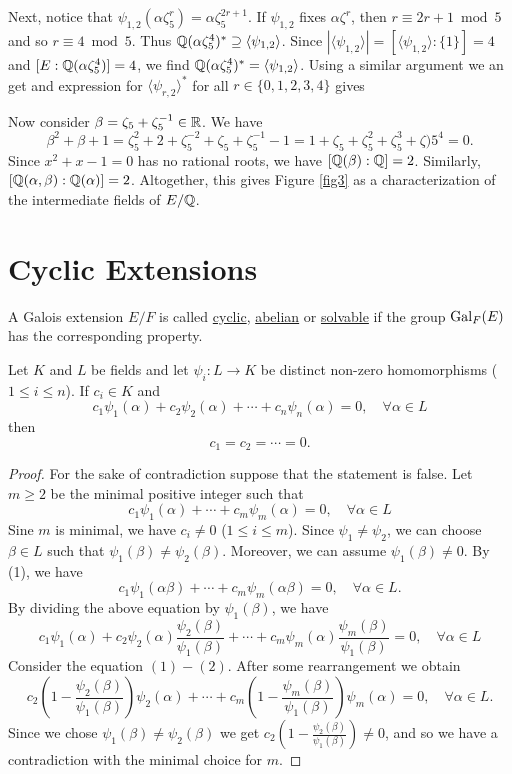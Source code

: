 \documentclass[11pt]{article}
\begin{document}
Next, notice that $\psi_{1,2}(\alpha\zeta_5^r)=\alpha\zeta_5^{2r+1}$. If $\psi_{1,2}$ fixes $\alpha\zeta^r$, then $r\equiv2r+1\bmod{5}$ and so $r\equiv4\bmod{5}$. Thus $\mathbb{Q}(\alpha\zeta_5^4)^*\supseteq\langle\psi_{1,2}\rangle$. Since $|\langle\psi_{1,2}\rangle|=[\langle\psi_{1,2}\rangle:\{1\}]=4$ and $[E:\mathbb{Q}(\alpha\zeta_5^4)]=4$, we find $\mathbb{Q}(\alpha\zeta_5^4)^*=\langle\psi_{1,2}\rangle$. Using a similar argument we an get  and expression for $\langle\psi_{r,2}\rangle^*$ for all $r\in\{0,1,2,3,4\}$ gives
\[\]

Now consider $\beta=\zeta_5+\zeta_5^{-1}\in\mathbb{R}$. We have
\[\beta^2+\beta+1=\zeta_5^2+2+\zeta_5^{-2}+\zeta_5+\zeta_5^{-1}-1=1+\zeta_5+\zeta_5^2+\zeta_5^3+\zeta)5^4=0.\]
Since $x^2+x-1=0$ has no rational roots, we have $[\mathbb{Q}(\beta):\mathbb{Q}]=2$. Similarly, $[\mathbb{Q}(\alpha,\beta):\mathbb{Q}(\alpha)]=2$. Altogether, this gives Figure \ref{fig3} as a characterization of the intermediate fields of $E/\mathbb{Q}$.

\pagebreak
\section{Cyclic Extensions}

\begin{definition}
    A Galois extension $E/F$ is called \ul{cyclic}, \ul{abelian} or \ul{solvable} if the group $\operatorname{Gal}_F(E)$ has the corresponding property.
\end{definition}

\begin{lemma}
    Let $K$ and $L$ be fields and let $\psi_i:L\to K$ be distinct non-zero homomorphisms ($1\leq i\leq n$). If $c_i\in K$ and
    \[c_1\psi_1(\alpha)+c_2\psi_2(\alpha)+\cdots+c_n\psi_n(\alpha)=0,\quad\forall\alpha\in L\]
    then
    \[c_1=c_2=\cdots=0.\]
\end{lemma}

\begin{proof}
    For the sake of contradiction suppose that the statement is false. Let $m\geq 2$ be the minimal positive integer such that
    \[c_1\psi_1(\alpha)+\cdots+c_m\psi_m(\alpha)=0,\quad\forall\alpha\in L\tag{1}\]
    Sine $m$ is minimal, we have $c_i\neq0$ ($1\leq i\leq m$). Since $\psi_1\neq\psi_2$, we can choose $\beta\in L$ such that $\psi_1(\beta)\neq\psi_2(\beta)$. Moreover, we can assume $\psi_1(\beta)\neq0$. By (1), we have
    \[c_1\psi_1(\alpha\beta)+\cdots+c_m\psi_m(\alpha\beta)=0,\quad\forall\alpha\in L.\]
    By dividing the above equation by $\psi_1(\beta)$, we have
    \[c_1\psi_1(\alpha)+c_2\psi_2(\alpha)\frac{\psi_2(\beta)}{\psi_1(\beta)}+\cdots+c_m\psi_m(\alpha)\frac{\psi_m(\beta)}{\psi_1(\beta)}=0,\quad\forall\alpha\in L\tag{2}\]
    Consider the equation $(1)-(2)$. After some rearrangement we obtain
    \[c_2\left(1-\frac{\psi_2(\beta)}{\psi_1(\beta)}\right)\psi_2(\alpha)+\cdots+c_m\left(1-\frac{\psi_m(\beta)}{\psi_1(\beta)}\right)\psi_m(\alpha)=0,\quad\forall\alpha\in L.\]
    Since we chose $\psi_1(\beta)\neq\psi_2(\beta)$ we get $c_2(1-\frac{\psi_2(\beta)}{\psi_1(\beta)})\neq0$, and so we have a contradiction with the minimal choice for $m$.
    
\end{proof}
\end{document}
